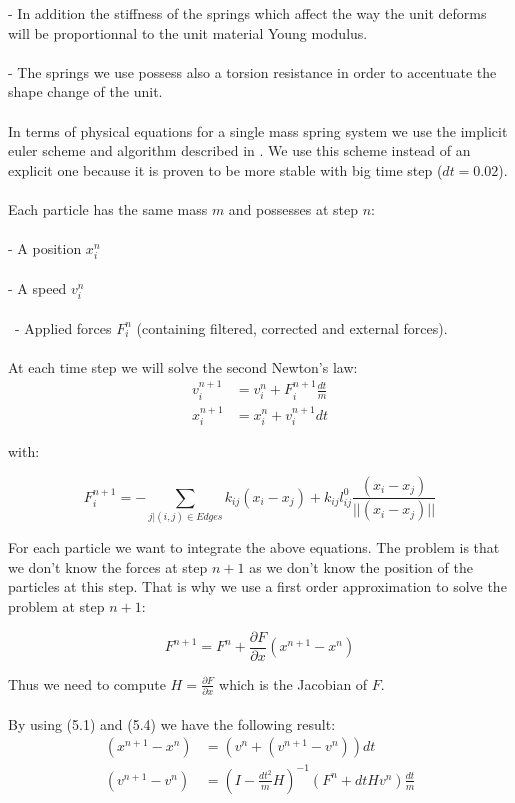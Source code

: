 \documentclass[12pt, a4paper]{report} %
\begin{document}
	\indent	- In addition the stiffness of the springs which affect the way the unit deforms will be proportionnal to the unit material Young modulus. \\\\
\indent	- The springs we use possess also a torsion resistance in order to accentuate the shape change of the unit.\\\\
In terms of physical equations for a single mass spring system we use the implicit euler scheme and algorithm described in \cite{caltech}. We use this scheme instead of an explicit one because it is proven to be more stable with big time step ($dt = 0.02$).\\\\ 
Each particle has the same mass $m$ and possesses at step $n$:\\\\
\indent	- A position  $x_i^n$\\\\
\indent	- A speed $v_i^n$ \\\\\
\indent	- Applied forces $F_i^n$ (containing filtered, corrected and external forces).\\\\
At each time step we will solve the second Newton's law:\\

\begin{align}
	v_i^{n+1} &= v_i^n + F_i^{n+1} \frac{dt}{m}\\
	x_i^{n+1} &= x_i^n + v_i^{n+1} dt 
\end{align}

with:

\begin{equation}
F_i^{n+1} = - \sum\limits_{j|(i,j)\in Edges} k_{ij}(x_i - x_j) + k_{ij}l_{ij}^0\frac{(x_i - x_j)}{||(x_i - x_j)||}
\end{equation}


For each particle we want to integrate the above equations. The problem is that we don't know the forces at step $n + 1$ as we don't know the position of the particles at this step. That is why we use a first order approximation to solve the problem at step $n + 1$:

\begin{equation}
	F^{n+1} = F^n + \frac{\partial F}{\partial x}(x^{n+1} - x^n)
\end{equation}

\noindent Thus we need to compute $H =  \frac{\partial F}{\partial x}$ which is the Jacobian of $F$.\\\\
\noindent By using (5.1) and (5.4) we have the following result:
\begin{align*}
	(x^{n+1} - x^n) &= (v^n + (v^{n+1} - v^n))dt \\
	(v^{n+1} - v^n) &= (I - \frac{dt^2}{m}H)^{-1}(F^n + dt H v^n)\frac{dt}{m}
\end{align*}
\end{document}
